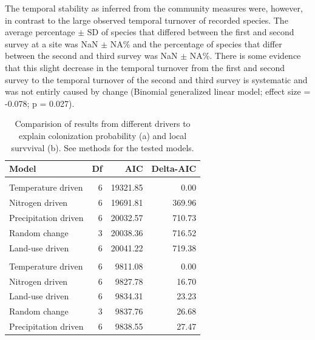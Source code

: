 \documentclass[fleqn,10pt,lineno]{wlpeerj} %
\theoremstyle{definition}
\theoremstyle{definition}
\theoremstyle{definition}
\theoremstyle{remark}
\begin{document}
The temporal stability as inferred from the community measures were,
however, in contrast to the large observed temporal turnover of recorded
species. The average percentage \(\pm\) SD of species that differed
between the first and second survey at a site was NaN \(\pm\) NA\% and
the percentage of species that differ between the second and third
survey was NaN \(\pm\) NA\%. There is some evidence that this slight
decrease in the temporal turnover from the first and second survey to
the temporal turnover of the second and third survey is systematic and
was not entirly caused by change (Binomial generalized linear model;
effect size = -0.078; p = 0.027).

\begin{table}

\caption{\label{tab:resdifeffects}Comparision of results from different drivers to explain colonization probability (a) and local survvival (b). See methods for the tested models.}
\centering
\begin{tabular}[t]{lrrr}
\toprule
Model & Df & AIC & Delta-AIC\\
\midrule
\addlinespace[0.3em]
\multicolumn{4}{l}{\textit{(a) Colonization probability}}\\
\hspace{1em}Temperature driven & 6 & 19321.85 & 0.00\\
\hspace{1em}Nitrogen driven & 6 & 19691.81 & 369.96\\
\hspace{1em}Precipitation driven & 6 & 20032.57 & 710.73\\
\hspace{1em}Random change & 3 & 20038.36 & 716.52\\
\hspace{1em}Land-use driven & 6 & 20041.22 & 719.38\\
\addlinespace[0.3em]
\multicolumn{4}{l}{\textit{(b) Local survival probability}}\\
\hspace{1em}Temperature driven & 6 & 9811.08 & 0.00\\
\hspace{1em}Nitrogen driven & 6 & 9827.78 & 16.70\\
\hspace{1em}Land-use driven & 6 & 9834.31 & 23.23\\
\hspace{1em}Random change & 3 & 9837.76 & 26.68\\
\hspace{1em}Precipitation driven & 6 & 9838.55 & 27.47\\
\bottomrule
\end{tabular}
\end{table}
\end{document}
